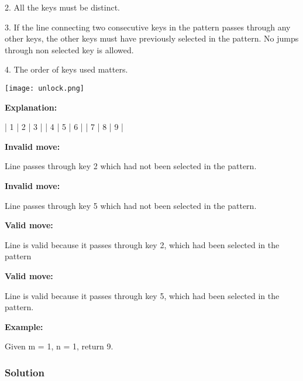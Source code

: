 2. All the keys must be distinct.

3. If the line connecting two consecutive keys in the pattern passes through any other keys, the other keys must have previously selected in the pattern. No jumps through non selected key is allowed.

4. The order of keys used matters.

\begin{center}
\texttt{[image: unlock.png]}\\
\end{center}

\textbf{Explanation:}
\begin{Code}
| 1 | 2 | 3 |
| 4 | 5 | 6 |
| 7 | 8 | 9 |
\end{Code}

\textbf{Invalid move:} 

Line  passes through key 2 which had not been selected in the pattern.

\textbf{Invalid move:} 

Line  passes through key 5 which had not been selected in the pattern.

\textbf{Valid move:} 

Line  is valid because it passes through key 2, which had been selected in the pattern

\textbf{Valid move:} 

Line  is valid because it passes through key 5, which had been selected in the pattern.

\textbf{Example:}

Given m = 1, n = 1, return 9.

\subsubsection{Solution}
\begin{Code}
\end{Code}
\newpage